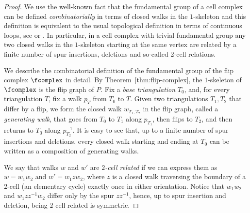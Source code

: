 %
% 

\begin{proof}%
We use the well-known fact that the fundamental group of a cell complex can be defined \emph{combinatorially} in terms of closed walks in the $1$-skeleton and this definition is equivalent to the usual topological definition in terms of continuous loops, see \cite[Chap.~7]{Seifert:A-Textbook-of-Topology-1980} or \cite[Chap.~4]{Stillwell:Classical-topology-and-combinatorial-group-1993}. In particular, in a cell complex with trivial fundamental group any two closed walks in the $1$-skeleton starting at the same vertex are related by a finite number of spur insertions, deletions and so-called 2-cell relations.  

We describe the combinatorial definition of the fundamental group of the flip complex $\fcomplex$ in detail. By Theorem~\ref{thm:flip-complex}, the $1$-skeleton of $\fcomplex$ is the flip graph of $P$. Fix a \emph{base triangulation} $T_0$, and, for every triangulation $T$, fix a walk $p_T$ from $T_0$ to $T$. Given two triangulations $T_1,T_2$ that differ by a flip, we form the closed walk $w_{T_1,T_2}$ in the flip graph, called a \emph{generating walk}, that goes from $T_0$ to $T_1$ along $p_{T_1}$, then flips to $T_2$, and then returns to $T_0$ along $p^{-1}_{T_2}$.  It is easy to see that, up to a finite number of spur insertions and deletions, every closed walk starting and ending at $T_0$ can be written as a composition of generating walks.

We say that walks $w$ and $w'$ are \emph{$2$-cell related} if we can express them as
$w=w_1w_2$ and $w'=w_1z w_2$, where $z$ is a closed walk traversing the boundary 
of a $2$-cell (an elementary cycle) exactly once in either orientation. 
Notice that $w_1w_2$ and $w_1zz^{-1}w_2$ differ only by the spur $zz^{-1}$, hence, up to spur insertion and deletion, being $2$-cell related is symmetric. 
 

\end{proof}
